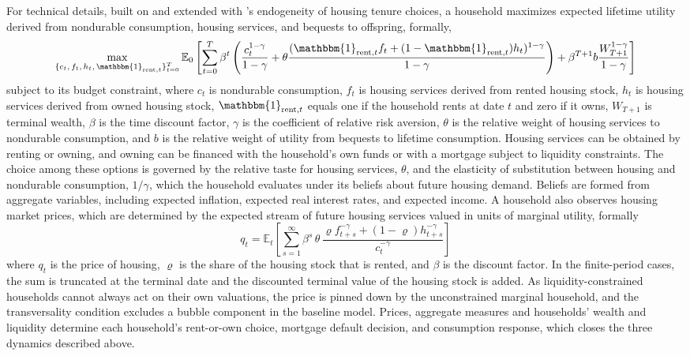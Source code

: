 \documentclass{style/fulbright}
\begin{document}
For technical details, built on  and extended with 's endogeneity of housing tenure choices, a household maximizes expected lifetime utility derived from nondurable consumption, housing services, and bequests to offspring, formally,
\begin{equation}
  \max_{\{c_t,\, f_t,\, h_t,\, \mathbbm{1}_{\text{rent},t}\}_{t=0}^{T}} \mathbb{E}_0 \left[ \sum_{t=0}^{T} \beta^t \left( \frac{c_t^{1-\gamma}}{1-\gamma}  + \theta \frac{(\mathbbm{1}_{\text{rent},t}f_t + (1-\mathbbm{1}_{\text{rent},t})h_t)^{1-\gamma}}{1-\gamma} \right)  + \beta^{T+1} b \frac{W_{T+1}^{1-\gamma}}{1-\gamma} \right]
\end{equation}
subject to its budget constraint, where $c_t$ is nondurable consumption, $f_t$ is housing services derived from rented housing stock, $h_t$ is housing services derived from owned housing stock, $\mathbbm{1}_{\text{rent},t}$ equals one if the household rents at date $t$ and zero if it owns, $W_{T+1}$ is terminal wealth, $\beta$ is the time discount factor, $\gamma$ is the coefficient of relative risk aversion, $\theta$ is the relative weight of housing services to nondurable consumption, and $b$ is the relative weight of utility from bequests to lifetime consumption. Housing services can be obtained by renting or owning, and owning can be financed with the household's own funds or with a mortgage subject to liquidity constraints. The choice among these options is governed by the relative taste for housing services, $\theta$, and the elasticity of substitution between housing and nondurable consumption, $1/\gamma$, which the household evaluates under its beliefs about future housing demand. Beliefs are formed from aggregate variables, including expected inflation, expected real interest rates, and expected income. A household also observes housing market prices, which are determined by the expected stream of future housing services valued in units of marginal utility, formally
\begin{equation}
  q_t = \mathbb{E}_t\left[\sum_{s=1}^{\infty}\beta^{s}\,\theta\,
\frac{\varrho f_{t+s}^{-\gamma} + (1-\varrho)h_{t+s}^{-\gamma}}{c_t^{-\gamma}} \right]
\end{equation}
where $q_t$ is the price of housing, $\varrho$ is the share of the housing stock that is rented, and $\beta$ is the discount factor. In the finite-period cases, the sum is truncated at the terminal date and the discounted terminal value of the housing stock is added. As liquidity-constrained households cannot always act on their own valuations, the price is pinned down by the unconstrained marginal household, and the transversality condition excludes a bubble component in the baseline model. Prices, aggregate measures and households' wealth and liquidity determine each household's rent-or-own choice, mortgage default decision, and consumption response, which closes the three dynamics described above.
\end{document}
